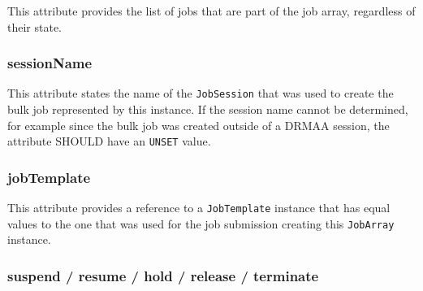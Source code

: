 \documentclass{article}
\newcommand{\h}[1]{\lstinline|#1|}
\newcommand{\rat}[1]{}
\begin{document}
This attribute provides the list of jobs that are part of the job array, regardless of their state. 

\rat{
We were asked for offering a filter support similar to JobSession here. This was rejected by discussion on the list (Jan 2011), since the number of jobs returned here is normally comparatively short. In this case, the DRM system cannot provide any benefit over the looped check in the application itself.

The disappearance of terminated jobs is intentionally not specified (see discussion above for \h{getJobs}).
}

\subsubsection{sessionName}

This attribute states the name of the \h{JobSession} that was used to create the bulk job represented by this instance. If the session name cannot be determined, for example since the bulk job was created outside of a DRMAA session, the attribute SHOULD have an \h{UNSET} value.

\rat{June 29th 2011 conf call decided to return session names instead of session objects. This keeps the consistent approach that instantiated session objects represent a live ``connection'' to the DRMS. Connecting to the referenced session is then a separate explicit step in the application. It also supports better that people create instances from bulk jobs created outside of a DRMAA session.
}

\subsubsection{jobTemplate}

This attribute provides a reference to a \h{JobTemplate} instance that has equal values to the one that was used for the job submission creating this \h{JobArray} instance. 

\rat{
The use case from SAGA perspective is that the user can easily resubmit the same job - just changing for example some command line parameter, but leaving the remainder fixed (mail by Andre Merzky, July 29th 2010).  
}

\subsubsection{suspend / resume / hold / release / terminate}
\end{document}
